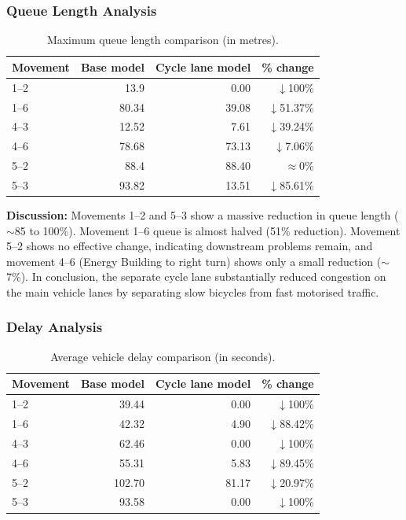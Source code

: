 \documentclass[11pt]{article}
\begin{document}
\subsubsection{Queue Length Analysis}
\begin{table}[H]
  \centering
  \small
  \caption{Maximum queue length comparison (in metres).}
  \begin{tabular}{@{}lrrr@{}}
    \toprule
    \textbf{Movement} & \textbf{Base model} & \textbf{Cycle lane model} & \textbf{\% change} \\
    \midrule
    1--2 & 13.9  & 0.00  & $\downarrow$100\% \\
    1--6 & 80.34 & 39.08 & $\downarrow$51.37\% \\
    4--3 & 12.52 & 7.61  & $\downarrow$39.24\% \\
    4--6 & 78.68 & 73.13 & $\downarrow$7.06\%  \\
    5--2 & 88.4  & 88.40 & $\approx$0\% \\
    5--3 & 93.82 & 13.51 & $\downarrow$85.61\% \\
    \bottomrule
  \end{tabular}
\end{table}

\textbf{Discussion:} Movements 1--2 and 5--3 show a massive reduction in queue length ($\sim$85 to
100\%). Movement 1--6 queue is almost halved (51\% reduction). Movement 5--2 shows no effective change,
indicating downstream problems remain, and movement 4--6 (Energy Building to right turn) shows only a
small reduction ($\sim$7\%). In conclusion, the separate cycle lane substantially reduced congestion on
the main vehicle lanes by separating slow bicycles from fast motorised traffic.

\subsubsection{Delay Analysis}
\begin{table}[H]
  \centering
  \small
  \caption{Average vehicle delay comparison (in seconds).}
  \begin{tabular}{@{}lrrr@{}}
    \toprule
    \textbf{Movement} & \textbf{Base model} & \textbf{Cycle lane model} & \textbf{\% change} \\
    \midrule
    1--2 & 39.44 & 0.00  & $\downarrow$100\% \\
    1--6 & 42.32 & 4.90  & $\downarrow$88.42\% \\
    4--3 & 62.46 & 0.00  & $\downarrow$100\% \\
    4--6 & 55.31 & 5.83  & $\downarrow$89.45\% \\
    5--2 & 102.70 & 81.17 & $\downarrow$20.97\% \\
    5--3 & 93.58 & 0.00  & $\downarrow$100\% \\
    \bottomrule
  \end{tabular}
\end{table}
\end{document}
